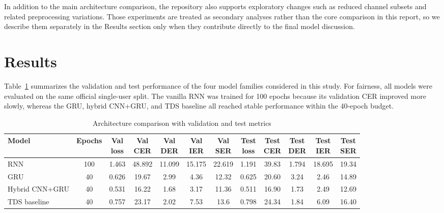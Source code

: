 \documentclass{article}
\begin{document}
In addition to the main architecture comparison, the repository also supports
exploratory changes such as reduced channel subsets and related preprocessing
variations. Those experiments are treated as secondary analyses rather than the
core comparison in this report, so we describe them separately in the Results
section only when they contribute directly to the final model discussion.

\section{Results}

Table~\ref{tab:architecture-results} summarizes the validation and test performance
of the four model families considered in this study. For fairness, all models were
evaluated on the same official single-user split. The vanilla RNN was trained for
100 epochs because its validation CER improved more slowly, whereas the GRU, hybrid
CNN+GRU, and TDS baseline all reached stable performance within the 40-epoch budget.

\begin{table}[t]
	\caption{Architecture comparison with validation and test metrics}
	\label{tab:architecture-results}
	\centering
	\setlength{\tabcolsep}{2pt}
	\begin{tabular}{@{}lccccccccccc@{}}
			\toprule
			Model          & Epochs & \shortstack{Val\\loss} & \shortstack{Val\\CER} & \shortstack{Val\\DER} & \shortstack{Val\\IER} & \shortstack{Val\\SER} & \shortstack{Test\\loss} & \shortstack{Test\\CER} & \shortstack{Test\\DER} & \shortstack{Test\\IER} & \shortstack{Test\\SER} \\
			\midrule
			RNN            & 100    & 1.463                 & 48.892               & 11.099  & 15.175  & 22.619  & 1.191                  & 39.83                 & 1.794    & 18.695   & 19.34    \\
			GRU            & 40     & 0.626                 & 19.67                & 2.99    & 4.36    & 12.32   & 0.625                  & 20.60                 & 3.24     & 2.46     & 14.89    \\
			Hybrid CNN+GRU & 40     & 0.531                 & 16.22                & 1.68    & 3.17    & 11.36   & 0.511                  & 16.90                 & 1.73     & 2.49     & 12.69    \\
			TDS baseline   & 40     & 0.757                 & 23.17                & 2.02    & 7.53    & 13.6    & 0.798                  & 24.34                 & 1.84     & 6.09     & 16.40    \\
			\bottomrule
	\end{tabular}
\end{table}
\end{document}
